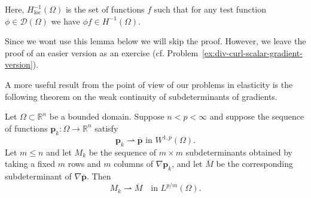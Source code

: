 Here, $H_{\mathrm{loc}}^{-1}(\Omega)$ is the set of functions $f$ such that for any test function $\phi\in\mathcal{D}(\Omega)$ we have $\phi f\in H^{-1}(\Omega)$.

Since we won\textquotesingle t use this lemma below we will skip the proof. However, we leave the proof of an easier version as an exercise (cf. Problem~\ref{ex:div-curl-scalar-gradient-version}).

A more useful result from the point of view of our problems in elasticity is the following theorem on the weak continuity of subdeterminants of gradients.

\begin{Theorem}
\label{thm:gradient-minors-weak-continuity}
Let $\Omega\subset\mathbb{R}^n$ be a bounded domain. Suppose $n<p<\infty$ and suppose the sequence of functions $\bm{p}_k:\Omega\to\mathbb{R}^n$ satisfy
\begin{equation}\label{eq:gradient-minors-weak-sobolev-sequence}
\bm{p}_k\rightharpoonup\overline{\bm{p}}\text{ in }W^{1,p}(\Omega).
\end{equation}
Let $m\leq n$ and let $M_k$ be the sequence of $m\times m$ subdeterminants obtained by taking a fixed $m$ rows and $m$ columns of $\nabla\bm{p}_k$, and let $\overline M$ be the corresponding subdeterminant of $\nabla\overline{\bm{p}}$. Then
\begin{equation}\label{eq:gradient-minors-weak-lp-over-order-limit}
M_k\rightharpoonup\overline M\quad\text{in }L^{p/m}(\Omega).
\end{equation}

\end{Theorem}

